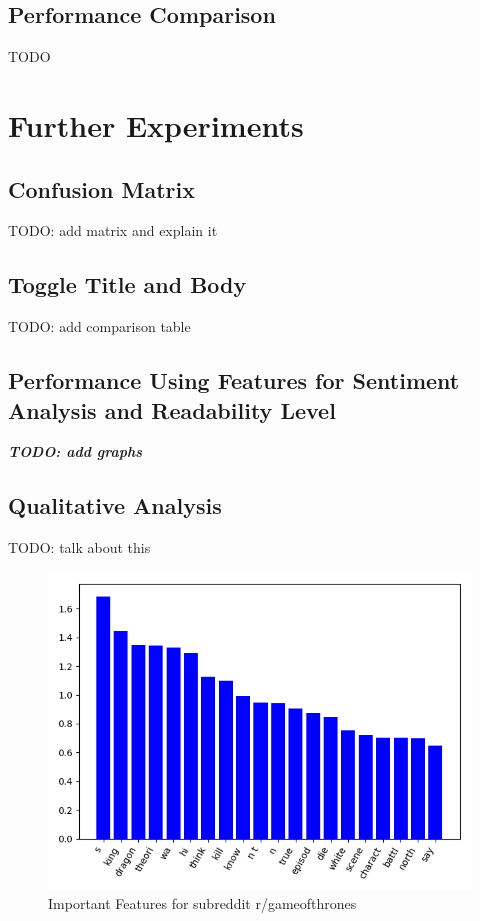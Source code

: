 \documentclass{sig-alternate-05-2015}
\begin{document}
\subsection{Performance Comparison}
TODO

\section{Further Experiments}
\subsection{Confusion Matrix}
TODO: add matrix and explain it

\subsection{Toggle Title and Body}
TODO: add comparison table

\subsection{Performance Using Features for Sentiment Analysis and Readability Level}

\textit{\textbf{TODO: add graphs}}

\subsection{Qualitative Analysis}
TODO: talk about this

\begin{figure}[H]
\centering
\includegraphics[width=\linewidth]{plots/coefficients-gameofthrones-dim-337.png}
\caption{Important Features for subreddit r/gameofthrones}
\end{figure}
\end{document}
